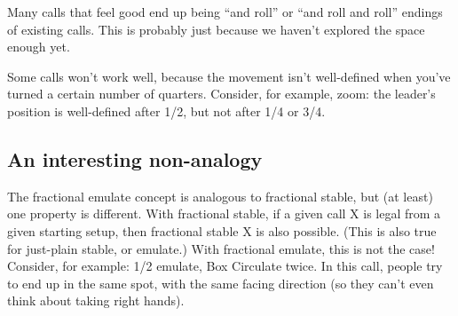 \documentclass[11pt]{article}
\begin{document}
Many calls that feel good end up being ``and roll'' or ``and roll and
roll'' endings of existing calls.  This is probably just because we
haven't explored the space enough yet.

Some calls won't work well, because the movement isn't well-defined
when you've turned a certain number of quarters.  Consider, for
example, zoom: the leader's position is well-defined after 1/2, but
not after 1/4 or 3/4.

\subsection*{An interesting non-analogy}

The fractional emulate concept is analogous to fractional stable,
but (at least) one property is different.
With fractional stable,
if a given call X is legal from a given starting setup,
then fractional stable X is also possible.
(This is also true for just-plain stable, or emulate.)
With fractional emulate, this is not the case!
Consider, for example: 1/2 emulate, Box Circulate twice.
In this call, people try to end up in the same spot,
with the same facing direction
(so they can't even think about taking right hands).
\end{document}
